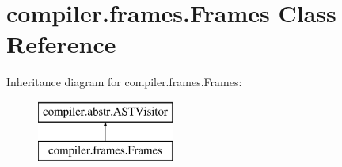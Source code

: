 \hypertarget{classcompiler_1_1frames_1_1_frames}{}\section{compiler.\+frames.\+Frames Class Reference}
\label{classcompiler_1_1frames_1_1_frames}
Inheritance diagram for compiler.\+frames.\+Frames\+:\begin{figure}[H]
\begin{center}
\leavevmode
\includegraphics[height=2.000000cm]{classcompiler_1_1frames_1_1_frames}
\end{center}
\end{figure}
